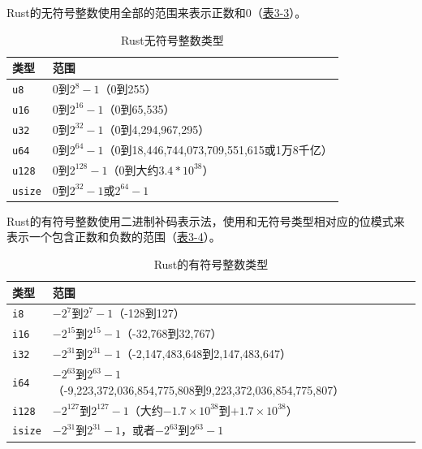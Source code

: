 Rust的无符号整数使用全部的范围来表示正数和0（\hyperref[t3-3]{表3-3}）。
\begin{table}[htbp]
    \centering
    \caption{Rust无符号整数类型}
    \label{t3-3}
    \begin{tabular}{ll}
        \hline
        \textbf{类型}   &   \textbf{范围}                   \\
        \hline
        \texttt{u8}     & 0到$2^{8}-1$（0到255）            \\
        \rowcolor{tablecolor}
        \texttt{u16}    & 0到$2^{16}-1$（0到65,535）        \\
        \texttt{u32}    & 0到$2^{32}-1$（0到4,294,967,295） \\
        \rowcolor{tablecolor}
        \texttt{u64}    & 0到$2^{64}-1$（0到18,446,744,073,709,551,615或1万8千亿）  \\
        \texttt{u128}   & 0到$2^{128}-1$（0到大约$3.4*10^{38}$）                    \\
        \rowcolor{tablecolor}
        \texttt{usize}  & 0到$2^{32}-1$或$2^{64}-1$         \\
    \end{tabular}
\end{table}

Rust的有符号整数使用二进制补码表示法，使用和无符号类型相对应的位模式来表示一个包含正数和负数的范围（\hyperref[t3-4]{表3-4}）。
\begin{table}[htbp]
    \centering
    \caption{Rust的有符号整数类型}
    \label{t3-4}
    \begin{tabular}{ll}
        \hline
        \textbf{类型}   &   \textbf{范围}   \\
        \hline
        \texttt{i8}     & $-2^{7}$到$2^{7}-1$（-128到127）   \\
        \rowcolor{tablecolor}
        \texttt{i16}    & $-2^{15}$到$2^{15}-1$（-32,768到32,767）  \\
        \texttt{i32}    & $-2^{31}$到$2^{31}-1$（-2,147,483,648到2,147,483,647）    \\
        \rowcolor{tablecolor}
        \texttt{i64}    & $-2^{63}$到$2^{63}-1$（-9,223,372,036,854,775,808到9,223,372,036,854,775,807）    \\
        \texttt{i128}   & $-2^{127}$到$2^{127}-1$（大约$-1.7\times10^{38}$到$+1.7\times10^{38}$） \\
        \rowcolor{tablecolor}
        \texttt{isize}  & $-2^{31}$到$2^{31}-1$，或者$-2^{63}$到$2^{63}-1$  \\
    \end{tabular}
\end{table}

